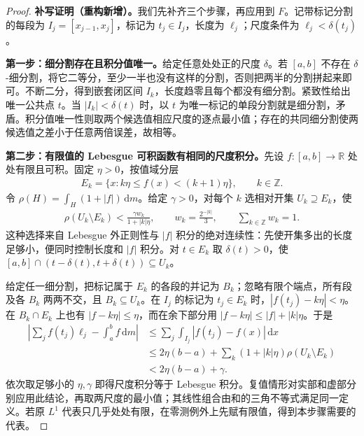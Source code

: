 \documentclass[../../main.tex]{subfiles}%
\begin{document}
\begin{proof}
\textbf{补写证明（重构新增）。}我们先补齐三个步骤，再应用到 $F$。记带标记分割的每段为 $I_j=[x_{j-1},x_j]$，标记为 $t_j\in I_j$，长度为 $\ell_j$；尺度条件为 $\ell_j<\delta(t_j)$。

\textbf{第一步：细分割存在且积分值唯一。}给定任意处处正的尺度 $\delta$。若 $[a,b]$ 不存在 $\delta$-细分割，将它二等分，至少一半也没有这样的分割，否则把两半的分割拼起来即可。不断二分，得到嵌套闭区间 $I_k$，长度趋零且每个都没有细分割。紧致性给出唯一公共点 $t$。当 $|I_k|<\delta(t)$ 时，以 $t$ 为唯一标记的单段分割就是细分割，矛盾。积分值唯一性则取两个候选值相应尺度的逐点最小值；存在的共同细分割使两候选值之差小于任意两倍误差，故相等。

\textbf{第二步：有限值的 Lebesgue 可积函数有相同的尺度积分。}先设 $f:[a,b]\to\mathbb R$ 处处有限且可积。固定 $\eta>0$，按值域分层
\begin{align*}
E_k=\{x:k\eta\le f(x)<(k+1)\eta\},\qquad k\in\mathbb Z.
\end{align*}
令 $\rho(H)=\int_H(1+|f|)\,\mathrm dm$。给定 $\gamma>0$，对每个 $k$ 选相对开集 $U_k\supseteq E_k$，使
\begin{align*}
\rho(U_k\setminus E_k)<\frac{\gamma w_k}{1+|k|\eta},
\qquad w_k=\frac{2^{-|k|}}3,\qquad\sum_{k\in\mathbb Z}w_k=1.
\end{align*}
这种选择来自 Lebesgue 外正则性与 $|f|$ 积分的绝对连续性：先使开集多出的长度足够小，便同时控制长度和 $|f|$ 积分。对 $t\in E_k$ 取 $\delta(t)>0$，使 $[a,b]\cap(t-\delta(t),t+\delta(t))\subseteq U_k$。

给定任一细分割，把标记属于 $E_k$ 的各段的并记为 $B_k$；忽略有限个端点，所有段及各 $B_k$ 两两不交，且 $B_k\subseteq U_k$。在 $I_j$ 的标记为 $t_j\in E_k$ 时，$|f(t_j)-k\eta|<\eta$。在 $B_k\cap E_k$ 上也有 $|f-k\eta|\le\eta$，而在余下部分用 $|f-k\eta|\le|f|+|k|\eta$。于是
\begin{align*}
\left|\sum_jf(t_j)\ell_j-\int_a^bf\,\mathrm dm\right|
&\le\sum_j\int_{I_j}|f(t_j)-f(x)|\,\mathrm dx\\
&\le2\eta(b-a)+\sum_k(1+|k|\eta)\rho(U_k\setminus E_k)\\
&<2\eta(b-a)+\gamma.
\end{align*}
依次取足够小的 $\eta,\gamma$ 即得尺度积分等于 Lebesgue 积分。复值情形对实部和虚部分别应用此结论，再取两尺度的最小值；其线性组合由和的三角不等式满足同一定义。若原 $L^1$ 代表只几乎处处有限，在零测例外上先赋有限值，得到本步骤需要的代表。


\end{proof}
\end{document}
